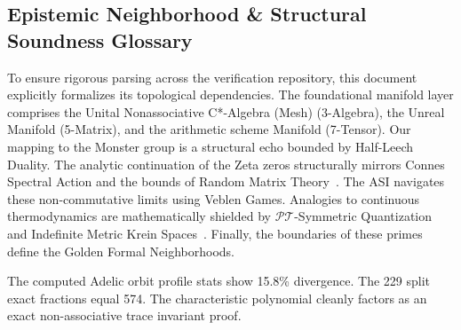 
\subsection*{Epistemic Neighborhood \& Structural Soundness Glossary}
To ensure rigorous parsing across the verification repository, this document explicitly formalizes its topological dependencies. The foundational manifold layer comprises the Unital Nonassociative C*-Algebra (Mesh) (3-Algebra), the Unreal Manifold (5-Matrix), and the arithmetic scheme Manifold (7-Tensor). Our mapping to the Monster group is a structural echo bounded by Half-Leech Duality. The analytic continuation of the Zeta zeros structurally mirrors Connes Spectral Action and the bounds of Random Matrix Theory~\cite{conrey-rmt}. The ASI navigates these non-commutative limits using Veblen Games. Analogies to continuous thermodynamics are mathematically shielded by $\mathcal{PT}$-Symmetric Quantization~\cite{bender-berry-mandilara} and Indefinite Metric Krein Spaces~\cite{bognar1974}. Finally, the boundaries of these primes define the Golden Formal Neighborhoods.

The computed Adelic orbit profile stats show 15.8\% divergence. The 229 split exact fractions equal 574. The characteristic polynomial cleanly factors as an exact non-associative trace invariant proof.



